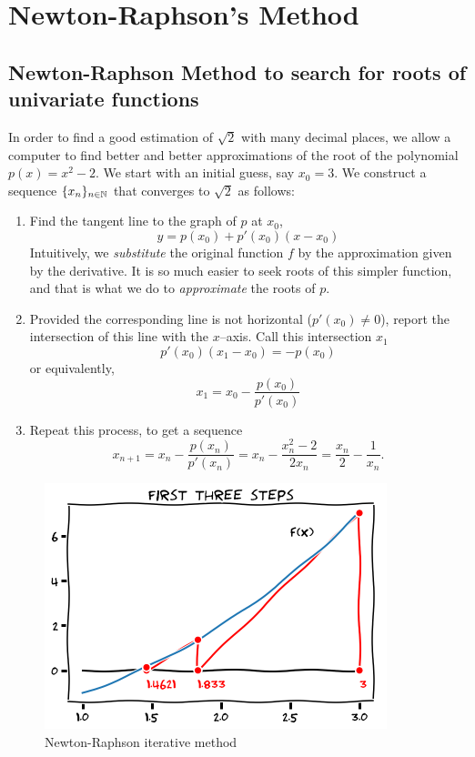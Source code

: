 
\section{Newton-Raphson's Method}

\subsection{Newton-Raphson Method to search for roots of univariate functions}

In order to find a good estimation of $\sqrt{2}$ with many decimal places, we allow a computer to find better and better approximations of the root  of the polynomial $p(x)=x^2-2$.  We start with an initial guess, say $x_0=3$.  We construct a sequence $\{ x_n \}_{n\in\mathbb{N}}$ that converges to $\sqrt{2}$ as follows:
\begin{enumerate}
\item Find the tangent line to the graph of $p$ at $x_0$, 
\begin{equation*}
y = p(x_0) + p'(x_0)(x-x_0)
\end{equation*}
Intuitively, we \emph{substitute} the original function $f$ by the approximation given by the derivative.  It is so much easier to seek roots of this simpler function, and that is what we do to \emph{approximate} the roots of $p$.
\item Provided the corresponding line is not horizontal ($p'(x_0)\neq 0$), report the intersection of this line with the $x$--axis.  Call this intersection $x_1$
\begin{equation*}
p'(x_0) (x_1 - x_0) = -p(x_0)
\end{equation*}
or equivalently,
\begin{equation*}
x_1=x_0-\frac{p(x_0)}{p'(x_0)}
\end{equation*}
\item Repeat this process, to get a sequence 
\begin{equation*}
x_{n+1} = x_n - \frac{p(x_n)}{p'(x_n)} = x_n - \frac{x_n^2-2}{2x_n}=\frac{x_n}{2}-\frac{1}{x_n}.
\end{equation*}
\end{enumerate}
\begin{figure}[ht!]
\includegraphics[width=0.6\linewidth]{images/newton1.png}
\caption{Newton-Raphson iterative method}
\label{figure:Newton-Raphson}
\end{figure}
